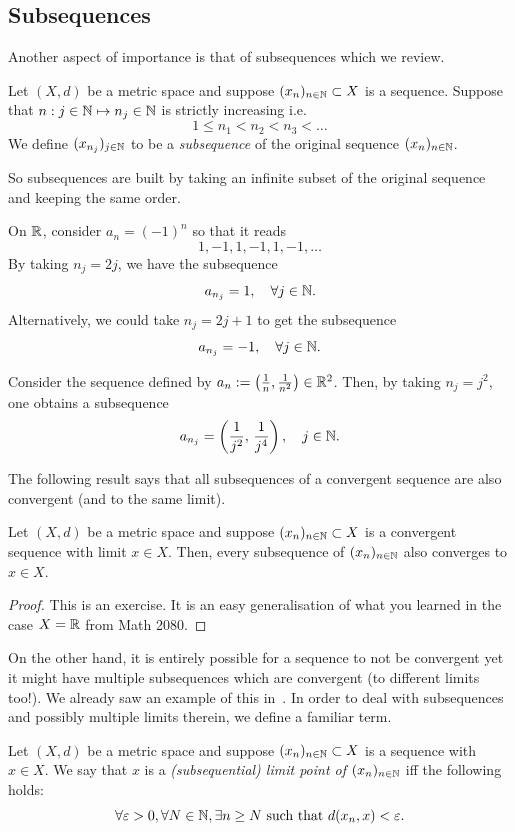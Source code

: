\subsection{Subsequences}
\label{sec:subseq}
Another aspect of importance is that of subsequences which we review.
\begin{defn}[Subsequences]
Let $(X,d)$ be a metric space and suppose $(x_n)_{n\in \mathbb{N}}\subset X$ is a sequence. Suppose that $n: j\in \mathbb{N} \mapsto n_j \in \mathbb{N}$ is strictly increasing i.e.
\[
1 \le n_1 < n_2 < n_3 < \dots
\]
We define $(x_{n_j})_{j\in\mathbb{N}}$ to be a \textit{subsequence} of the original sequence $(x_n)_{n\in\mathbb{N}}$.
\end{defn}
So subsequences are built by taking an infinite subset of the original sequence and keeping the same order.
\begin{eg}
\label{eg:seq_alt}
On $\mathbb{R}$, consider $a_n = (-1)^n$ so that it reads
\[
1,-1,1,-1,1,-1,\dots
\]
By taking $n_j = 2j$, we have the subsequence
\[
a_{n_j} = 1,\quad \forall j\in\mathbb{N}.
\]
Alternatively, we could take $n_j = 2j+1$ to get the subsequence
\[
a_{n_j} = -1,\quad \forall j\in\mathbb{N}.
\]
\end{eg}
\begin{eg}
Consider the sequence defined by $a_n := \left(\frac{1}{n},\frac{1}{n^2}\right)\in \mathbb{R}^2$. Then, by taking $n_j = j^2$, one obtains a subsequence
\[
a_{n_j} = \left(\frac{1}{j^2},\, \frac{1}{j^4}\right),\quad j\in \mathbb{N}.
\]
\end{eg}
The following result says that all subsequences of a convergent sequence are also convergent (and to the same limit).
\begin{lemma}
\label{lem:cvg_imp_sub_cvg}
Let $(X,d)$ be a metric space and suppose $(x_n)_{n\in\mathbb{N}}\subset X$ is a convergent sequence with limit $x\in X$. Then, every subsequence of $(x_n)_{n\in\mathbb{N}}$ also converges to $x\in X$.
\end{lemma}
\begin{proof}
This is an exercise. It is an easy generalisation of what you learned in the case $X = \mathbb{R}$ from Math 2080.
\end{proof}
On the other hand, it is entirely possible for a sequence to not be convergent yet it might have multiple subsequences which are convergent (to different limits too!). We already saw an example of this in~. In order to deal with subsequences and possibly multiple limits therein, we define a familiar term.
\begin{defn}
\label{defn:subseq_lim}
Let $(X,d)$ be a metric space and suppose $(x_n)_{n\in\mathbb{N}}\subset X$ is a sequence with $x\in X$. We say that $x$ is a \textit{(subsequential) limit point of $(x_n)_{n\in\mathbb{N}}$} iff the following holds:
\[
\forall \varepsilon>0,\forall N\in\mathbb{N}, \exists n\ge N\text{ such that }d(x_n,x)<\varepsilon.
\]
\end{defn}
